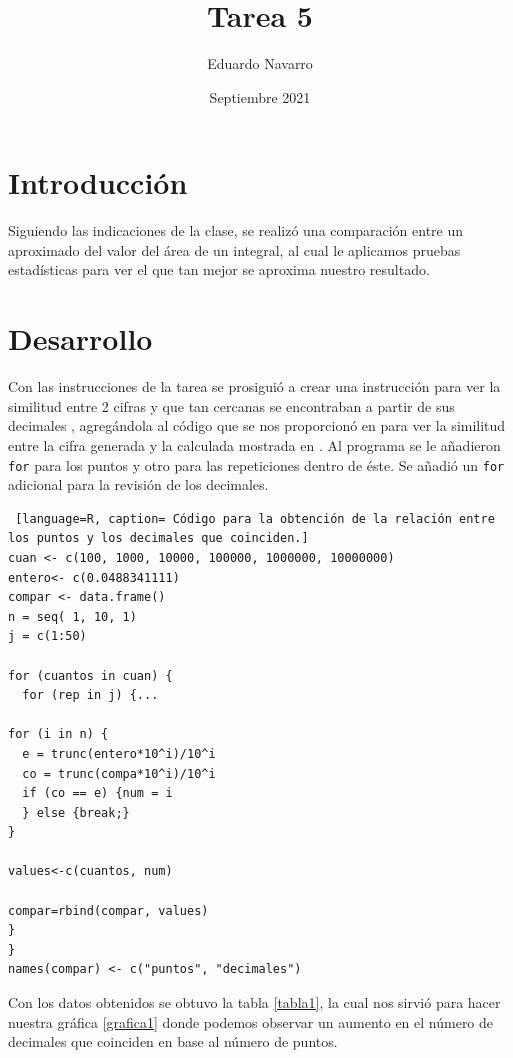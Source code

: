 \documentclass{article}
\title{Tarea 5}
\author{Eduardo Navarro}
\date{Septiembre 2021}
\begin{document}
\maketitle

\section{Introducción}
Siguiendo las indicaciones de la clase, se realizó una comparación entre un aproximado del valor del área de un integral, al cual le aplicamos pruebas estadísticas para ver el que tan mejor se aproxima nuestro resultado.

\section{Desarrollo}
Con las instrucciones de la tarea \cite{twitchsimu} se prosiguió a crear una instrucción para ver la similitud entre 2 cifras y que tan cercanas se encontraban a partir de sus decimales \cite{p}, agregándola al código que se nos proporcionó en \cite{montec} para ver la similitud entre la cifra generada y la calculada mostrada en \cite{montec}. Al programa se le añadieron \texttt{for} para los puntos y otro para las repeticiones dentro de éste. Se añadió un \texttt{for} adicional para la revisión de los decimales.


\begin{lstlisting} [language=R, caption= Código para la obtención de la relación entre los puntos y los decimales que coinciden.]
cuan <- c(100, 1000, 10000, 100000, 1000000, 10000000)
entero<- c(0.0488341111)
compar <- data.frame()
n = seq( 1, 10, 1)
j = c(1:50)

for (cuantos in cuan) {
  for (rep in j) {...
  
for (i in n) {
  e = trunc(entero*10^i)/10^i
  co = trunc(compa*10^i)/10^i
  if (co == e) {num = i
  } else {break;}
}

values<-c(cuantos, num)

compar=rbind(compar, values)
}
}
names(compar) <- c("puntos", "decimales")
\end{lstlisting}
\newpage
Con los datos obtenidos se obtuvo la tabla \ref{tabla1}, la cual nos sirvió para hacer nuestra gráfica \ref{grafica1} donde podemos observar un aumento en el número de decimales que coinciden en base al número de puntos.
\end{document}
